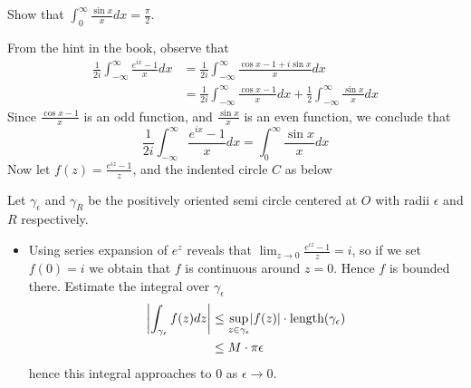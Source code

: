 \begin{problem}[Stien, Ex 2, p. 64]
	Show that $\displaystyle\int_0^{\infty}\frac{\sin x} xdx=\frac\pi 2$.
\end{problem}
\begin{solution}
	From the hint in the book, observe that
  \begin{align*}
  	\frac1{2i}\int_{-\infty}^{\infty}\frac{e^{ix}-1}x dx
    &=\frac1{2i}\int_{-\infty}^{\infty}\frac{\cos x-1 +i\sin x}x dx\\
    &=\frac1{2i}\int_{-\infty}^{\infty}\frac{\cos x-1}{x}dx +
      \frac1{2}\int_{-\infty}^{\infty}\frac{\sin x}x dx
  \end{align*}
  Since $\frac{\cos x-1}x$ is an odd function, and
  $\frac{\sin x}x$ is an even function, we conclude that
  \[
    \boxed{
    \frac1{2i}\int_{-\infty}^{\infty}\frac{e^{ix}-1}x dx
    = \int_{0}^{\infty}\frac{\sin x}x dx}
  \]
  Now let $f(z)=\frac{e^{iz}-1}{z}$, and the indented circle $C$ as below
  \begin{center}
  \end{center}
  Let $\gamma_{\epsilon}$ and $\gamma_{R}$ be the positively oriented semi circle
  centered at $O$ with radii $\epsilon$ and $R$ respectively.
  \begin{itemize}
  \item Using series expansion of $e^z$ reveals that
    $\displaystyle\lim_{z\to 0}\frac{e^{iz}-1}{z}=i$, so if we set $f(0)=i$ we obtain
    that $f$ is continuous around $z=0$. Hence $f$ is bounded
    there. Estimate the integral over $\gamma_{\epsilon}$
    \begin{align*}
    	\abs*{\int_{\gamma_\epsilon}f(z)dz}
      &\leq \sup_{z\in\gamma_\epsilon}\abs{f(z)}\cdot \text{length}(\gamma_\epsilon)\\
      &\leq M\cdot \pi\epsilon
    \end{align*}
    hence this integral approaches to $0$ as $\epsilon\to 0$.


\end{itemize}
\end{solution}

